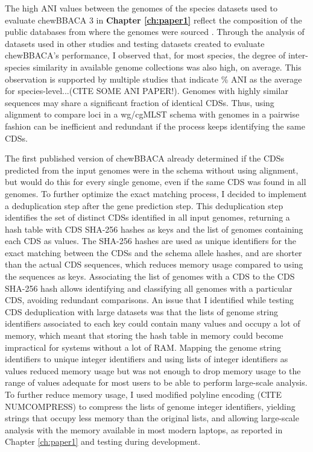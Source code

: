 The high \ac{ANI} values between the genomes of the species datasets used to evaluate chewBBACA 3 in \textbf{Chapter \ref{ch:paper1}} reflect the composition of the public databases from where the genomes were sourced \cite{oleary_reference_2016, blackwell_exploring_2021}. Through the analysis of datasets used in other studies and testing datasets created to evaluate chewBBACA's performance, I observed that, for most species, the degree of inter-species similarity in available genome collections was also high, on average. This observation is supported by multiple studies that indicate \% ANI as the average for species-level...(CITE SOME ANI PAPER!). Genomes with highly similar sequences may share a significant fraction of identical \ac{CDSs}. Thus, using alignment to compare loci in a wg/cgMLST schema with genomes in a pairwise fashion can be inefficient and redundant if the process keeps identifying the same \ac{CDSs}.

The first published version of chewBBACA already determined if the \ac{CDSs} predicted from the input genomes were in the schema without using alignment, but would do this for every single genome, even if the same \ac{CDS} was found in all genomes. To further optimize the exact matching process, I decided to implement a deduplication step after the gene prediction step. This deduplication step identifies the set of distinct \ac{CDSs} identified in all input genomes, returning a hash table with \ac{CDS} SHA-256 hashes as keys and the list of genomes containing each \ac{CDS} as values. The SHA-256 hashes are used as unique identifiers for the exact matching between the \ac{CDSs} and the schema allele hashes, and are shorter than the actual \ac{CDS} sequences, which reduces memory usage compared to using the sequences as keys. Associating the list of genomes with a \ac{CDS} to the \ac{CDS} SHA-256 hash allows identifying and classifying all genomes with a particular \ac{CDS}, avoiding redundant comparisons. An issue that I identified while testing \ac{CDS} deduplication with large datasets was that the lists of genome string identifiers associated to each key could contain many values and occupy a lot of memory, which meant that storing the hash table in memory could become impractical for systems without a lot of \ac{RAM}. Mapping the genome string identifiers to unique integer identifiers and using lists of integer identifiers as values reduced memory usage but was not enough to drop memory usage to the range of values adequate for most users to be able to perform large-scale analysis. To further reduce memory usage, I used modified polyline encoding (CITE NUMCOMPRESS) to compress the lists of genome integer identifiers, yielding strings that occupy less memory than the original lists, and allowing large-scale analysis with the memory available in most modern laptops, as reported in Chapter \ref{ch:paper1} and testing during development.

